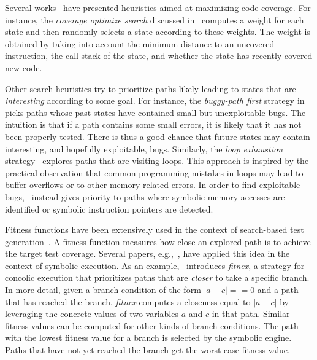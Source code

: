Several works~\cite{EXE-CCS06,KLEE-OSDI08,MAYHEM-SP12,CKC-TOCS12} have presented heuristics aimed at maximizing code coverage. For instance, the {\em coverage optimize search} discussed in~\cite{KLEE-OSDI08} computes a weight for each state and then randomly selects a state according to these weights. The weight is obtained by taking into account the minimum distance to an uncovered instruction, the call stack of the state, and whether the state has recently covered new code.

Other search heuristics try to prioritize paths likely leading to states that are {\em interesting} according to some goal. For instance, the {\em buggy-path first} strategy in~\cite{AEG-NDSS11} picks paths whose past states have contained small but unexploitable bugs. The intuition is that if a path contains some small errors, it is likely that it has not been properly tested. There is thus a good chance that future states may contain interesting, and hopefully exploitable, bugs. Similarly, the {\em loop exhaustion} strategy~\cite{AEG-NDSS11} explores paths that are visiting loops. This approach is inspired by the practical observation that common programming mistakes in loops may lead to buffer overflows or to other memory-related errors. In order to find exploitable bugs,~\cite{MAYHEM-SP12} instead gives priority to paths where symbolic memory accesses are identified or symbolic instruction pointers are detected. 

Fitness functions have been extensively used in the context of search-based test generation~\cite{M-STVR04}. A fitness function measures how close an explored path is to achieve the target test coverage. Several papers, e.g.,~\cite{XTD-DSN09,CS-CACM13,XTD-DSN09}, have applied this idea in the context of symbolic execution. As an example,~\cite{XTD-DSN09} introduces {\em fitnex}, a strategy for concolic execution that prioritizes paths that are {\em closer} to take a specific branch. In more detail, given a branch condition of the form $|a - c| == 0$ and a path that has reached the branch, {\em fitnex} computes a closeness equal to $|a - c|$ by leveraging the concrete values of two variables $a$ and $c$ in that path. Similar fitness values can be computed for other kinds of branch conditions. The path with the lowest fitness value for a branch is selected by the symbolic engine. Paths that have not yet reached the branch get the worst-case fitness value.

